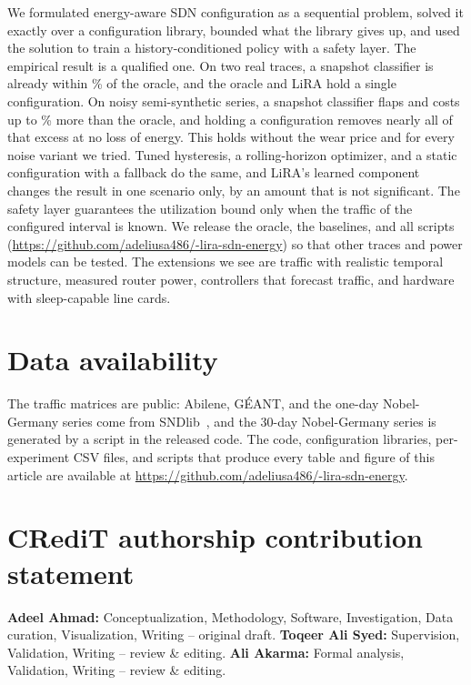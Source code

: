 \documentclass[5p,times]{elsarticle}
\begin{document}
We formulated energy-aware SDN configuration as a sequential problem, solved it exactly over a configuration library, bounded what the library gives up, and used the solution to train a history-conditioned policy with a safety layer. The empirical result is a qualified one. On two real traces, a snapshot classifier is already within \bfourAbiGap\% of the oracle, and the oracle and LiRA hold a single configuration. On noisy semi-synthetic series, a snapshot classifier flaps and costs up to \nzarAExcess\% more than the oracle, and holding a configuration removes nearly all of that excess at no loss of energy. This holds without the wear price and for every noise variant we tried. Tuned hysteresis, a rolling-horizon optimizer, and a static configuration with a fallback do the same, and LiRA's learned component changes the result in one scenario only, by an amount that is not significant. The safety layer guarantees the utilization bound only when the traffic of the configured interval is known. We release the oracle, the baselines, and all scripts (\url{https://github.com/adeliusa486/-lira-sdn-energy}) so that other traces and power models can be tested. The extensions we see are traffic with realistic temporal structure, measured router power, controllers that forecast traffic, and hardware with sleep-capable line cards.

\section*{Data availability}
The traffic matrices are public: Abilene, G\'{E}ANT, and the one-day Nobel-Germany series come from SNDlib~\cite{orlowski2010sndlib,uhlig2006geant,zhang2003tomogravity}, and the 30-day Nobel-Germany series is generated by a script in the released code. The code, configuration libraries, per-experiment CSV files, and scripts that produce every table and figure of this article are available at \url{https://github.com/adeliusa486/-lira-sdn-energy}.

\section*{CRediT authorship contribution statement}
\textbf{Adeel Ahmad:} Conceptualization, Methodology, Software, Investigation, Data curation, Visualization, Writing -- original draft. \textbf{Toqeer Ali Syed:} Supervision, Validation, Writing -- review \& editing. \textbf{Ali Akarma:} Formal analysis, Validation, Writing -- review \& editing.
\end{document}

